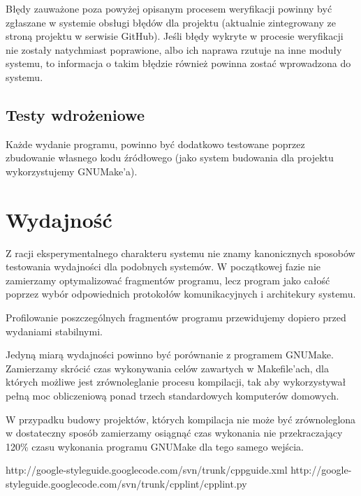 \documentclass[a4paper]{article}
\begin{document}
Błędy zauważone poza powyżej opisanym procesem weryfikacji powinny być zgłaszane w systemie obsługi błędów dla projektu (aktualnie zintegrowany ze stroną projektu w serwisie GitHub). Jeśli błędy wykryte w procesie weryfikacji nie zostały natychmiast poprawione, albo ich naprawa rzutuje na inne moduły systemu, to informacja o takim błędzie również powinna zostać wprowadzona do systemu.

\subsection{Testy wdrożeniowe}

Każde wydanie programu, powinno być dodatkowo testowane poprzez zbudowanie własnego kodu źródłowego (jako system budowania dla projektu wykorzystujemy GNUMake’a).

\section{Wydajność}

Z racji eksperymentalnego charakteru systemu nie znamy kanonicznych sposobów testowania wydajności dla podobnych systemów. W początkowej fazie nie zamierzamy optymalizować fragmentów programu, lecz program jako całość poprzez wybór odpowiednich protokołów komunikacyjnych i architekury systemu.

Profilowanie poszczególnych fragmentów programu przewidujemy dopiero przed wydaniami stabilnymi.

Jedyną miarą wydajności powinno być porównanie z programem GNUMake. Zamierzamy skrócić czas wykonywania celów zawartych w Makefile’ach, dla których możliwe jest zrównoleglanie procesu kompilacji, tak aby wykorzystywał pełną moc obliczeniową ponad trzech standardowych komputerów domowych.

W przypadku budowy projektów, których kompilacja nie może być zrównoleglona w dostateczny sposób zamierzamy osiągnąć czas wykonania nie przekraczający 120\% czasu wykonania programu GNUMake dla tego samego wejścia.

\begin{thebibliography}{9}
 http://google-styleguide.googlecode.com/svn/trunk/cppguide.xml
 http://google-styleguide.googlecode.com/svn/trunk/cpplint/cpplint.py
\end{thebibliography}
\end{document}
